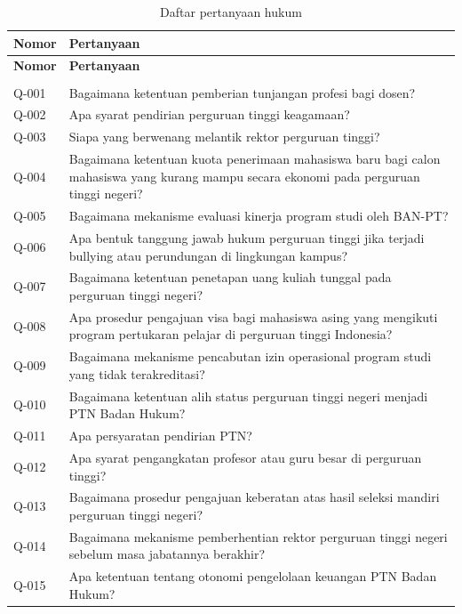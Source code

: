 \begin{longtable}{@{}>{\RaggedRight\arraybackslash}p{1.6cm}>{\RaggedRight\arraybackslash}p{\dimexpr\textwidth-1.6cm-2\tabcolsep\relax}@{}}
\caption{Daftar pertanyaan hukum}\label{tab:legal-question-list}\\
\toprule
\textbf{Nomor} & \textbf{Pertanyaan} \\
\midrule
\endfirsthead
\toprule
\textbf{Nomor} & \textbf{Pertanyaan} \\
\midrule
\endhead
\midrule
\multicolumn{2}{r@{}}{Bersambung ke halaman berikutnya}\\
\endfoot
\bottomrule
\endlastfoot
Q-001 & Bagaimana ketentuan pemberian tunjangan profesi bagi dosen? \\
Q-002 & Apa syarat pendirian perguruan tinggi keagamaan? \\
Q-003 & Siapa yang berwenang melantik rektor perguruan tinggi? \\
Q-004 & Bagaimana ketentuan kuota penerimaan mahasiswa baru bagi calon mahasiswa yang kurang mampu secara ekonomi pada perguruan tinggi negeri? \\
Q-005 & Bagaimana mekanisme evaluasi kinerja program studi oleh BAN-PT? \\
Q-006 & Apa bentuk tanggung jawab hukum perguruan tinggi jika terjadi bullying atau perundungan di lingkungan kampus? \\
Q-007 & Bagaimana ketentuan penetapan uang kuliah tunggal pada perguruan tinggi negeri? \\
Q-008 & Apa prosedur pengajuan visa bagi mahasiswa asing yang mengikuti program pertukaran pelajar di perguruan tinggi Indonesia? \\
Q-009 & Bagaimana mekanisme pencabutan izin operasional program studi yang tidak terakreditasi? \\
Q-010 & Bagaimana ketentuan alih status perguruan tinggi negeri menjadi PTN Badan Hukum? \\
Q-011 & Apa persyaratan pendirian PTN? \\
Q-012 & Apa syarat pengangkatan profesor atau guru besar di perguruan tinggi? \\
Q-013 & Bagaimana prosedur pengajuan keberatan atas hasil seleksi mandiri perguruan tinggi negeri? \\
Q-014 & Bagaimana mekanisme pemberhentian rektor perguruan tinggi negeri sebelum masa jabatannya berakhir? \\
Q-015 & Apa ketentuan tentang otonomi pengelolaan keuangan PTN Badan Hukum? \\

\end{longtable}

